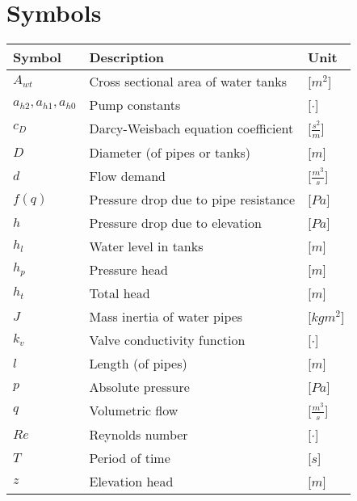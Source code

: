 \newpage

\section*{Symbols}


\begin{tabular}{l l l} 
	\textbf{Symbol}		&	\textbf{Description}								& \hspace{25mm}\textbf{Unit}	\\\hline

	$A_{wt}$ 			&	Cross sectional area of water tanks	 				& \hspace{25mm}[$m^2$]\\
	$a_{h2},a_{h1},a_{h0}$ &	Pump constants	 								& \hspace{25mm}[$\cdot$]\\
	$c_D$				&	Darcy-Weisbach equation coefficient	 				& \hspace{25mm}[$\frac{s^2}{m}$]\\
	$D$					&	Diameter (of pipes or tanks)						& \hspace{25mm}[$m$]\\
	$d$					&	Flow demand	 										& \hspace{25mm}[$\frac{m^3}{s}$]\\
	$f(q)$				&	Pressure drop due to pipe resistance				& \hspace{25mm}[$Pa$]\\
	$h$					&	Pressure drop due to elevation					    & \hspace{25mm}[$Pa$]\\
	$h_{l}$				&	Water level in tanks							    & \hspace{25mm}[$m$]\\
	$h_p$				&	Pressure head									    & \hspace{25mm}[$m$]\\
	$h_t$				&	Total head									        & \hspace{25mm}[$m$]\\
	$J$					&	Mass inertia of water pipes							& \hspace{25mm}[$kgm^2$]\\
	$k_v$				&	Valve conductivity function							& \hspace{25mm}[$\cdot$]\\
	$l$					&	Length (of pipes)									& \hspace{25mm}[$m$]\\
	$p$					&	Absolute pressure									& \hspace{25mm}[$Pa$]\\
	$q$					&	Volumetric flow									    & \hspace{25mm}[$\frac{m^3}{s}$]\\
	$Re$				&	Reynolds number								        & \hspace{25mm}[$\cdot$]\\
	$T$					&	Period of time								        & \hspace{25mm}[$s$]\\
	$z$					&	Elevation head									    & \hspace{25mm}[$m$]\\


\end{tabular}
